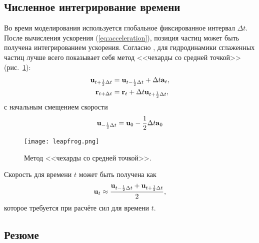 \subsection{Численное интегрирование времени}
Во время моделирования используется глобальное фиксированное интервал $\Delta t$. После вычисления ускорения (\ref{eq:acceleration}), позиция частиц может быть получена интегрированием ускорения. Согласно \cite{kelager}, для гидродинамики сглаженных частиц лучше всего показывает себя метод <<чехарды со средней точкой>> (рис.~\ref{fig:leapfrog}):
\begin{align}
  \label{eq:update-velocity}
  \boldsymbol{\mathbf{u}}_{t+\frac{1}{2}\Delta t}&=\boldsymbol{\mathbf{u}}_{t-\frac{1}{2}\Delta t}+\Delta t\boldsymbol{\mathbf{a}}_t,\\
  \label{eq:update-position}
  \boldsymbol{\mathbf{r}}_{t+\Delta t}&=\boldsymbol{\mathbf{r}}_t+\Delta t\boldsymbol{\mathbf{u}}_{t+\frac{1}{2}\Delta t},
\end{align}
с начальным смещением скорости
\begin{equation} \label{eq:init-leapfrog}
  \boldsymbol{\mathbf{u}}_{-\frac{1}{2}\Delta t}=\boldsymbol{\mathbf{u}}_0-\frac{1}{2}\Delta t\boldsymbol{\mathbf{a}}_0
\end{equation}

\begin{figure}[h]
  \centering
  \texttt{[image: leapfrog.png]}
  \caption{Метод <<чехарды со средней точкой>>.}
  \label{fig:leapfrog}
\end{figure}

Скорость для времени $t$ может быть получена как
\begin{equation} \label{eq:current-velocity}
  \boldsymbol{\mathbf{u}}_t\approx\frac{\boldsymbol{\mathbf{u}}_{t-\frac{1}{2}\Delta t}+\boldsymbol{\mathbf{u}}_{t+\frac{1}{2}\Delta t}}{2},
\end{equation}
которое требуется при расчёте сил для времени $t$.


\subsection{Резюме}

